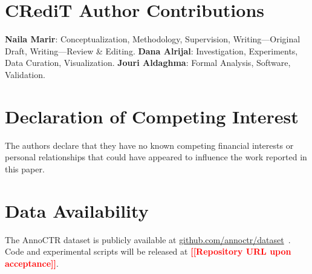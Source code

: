 \documentclass[review,1p,times,number]{elsarticle}
\newcommand{\TODO}[1]{\textcolor{red}{\textbf{[#1]}}}
\begin{document}
\section*{CRediT Author Contributions}
\textbf{Naila Marir}: Conceptualization, Methodology, Supervision,
Writing---Original Draft, Writing---Review \& Editing.
\textbf{Dana Alrijal}: Investigation, Experiments, Data Curation,
Visualization.
\textbf{Jouri Aldaghma}: Formal Analysis, Software, Validation.

\section*{Declaration of Competing Interest}
The authors declare that they have no known competing financial interests or
personal relationships that could have appeared to influence the work reported
in this paper.

\section*{Data Availability}
The AnnoCTR dataset is publicly available at
\href{https://github.com/annoctr/dataset}{github.com/annoctr/dataset}~\cite{annoctr2023}.
Code and experimental scripts will be released at
\TODO{[Repository URL upon acceptance]}.



\end{document}
